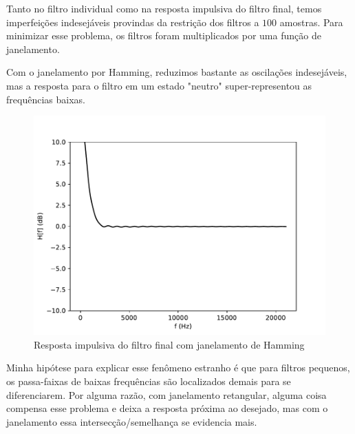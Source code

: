 \begin{multicols}{2}
Tanto no filtro individual como na resposta impulsiva do filtro final, temos imperfeições indesejáveis provindas da restrição dos filtros a $100$ amostras. Para minimizar esse problema, os filtros foram multiplicados por uma função de janelamento.

\end{multicols}

Com o janelamento por Hamming, reduzimos bastante as oscilações indesejáveis, mas a resposta para o filtro em um estado "neutro" super-representou as frequências baixas.

\begin{figure}[H]
    \centering
    \includegraphics[scale=0.5]{fig/100/Hamming/windowed.pdf}
    \caption{Resposta impulsiva do filtro final com janelamento de Hamming}
    \label{fig:imp resp total hamm}
\end{figure}

Minha hipótese para explicar esse fenômeno estranho é que para filtros pequenos, os passa-faixas de baixas frequências são localizados demais para se diferenciarem. Por alguma razão, com janelamento retangular, alguma coisa compensa esse problema e deixa a resposta próxima ao desejado, mas com o janelamento essa intersecção/semelhança se evidencia mais.

